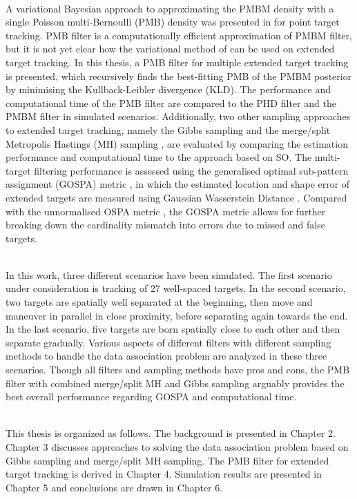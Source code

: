 ~\\
A variational Bayesian approach to approximating the PMBM density with a single Poisson multi-Bernoulli (PMB) density was presented in \cite{variational} for point target tracking. PMB filter is a computationally efficient approximation of PMBM filter, but it is not yet clear how the variational method of \cite{variational} can be used on extended target tracking. In this thesis, a PMB filter for multiple extended target tracking is presented, which recursively finds the best-fitting PMB of the PMBM posterior by minimising the Kullback-Leibler divergence (KLD). The performance and computational time of the PMB filter are compared to the PHD filter and the PMBM filter in simulated scenarios. Additionally, two other sampling approaches to extended target tracking, namely the Gibbs sampling \cite{gibbs} and the merge/split Metropolis Hastings (MH) sampling \cite{mergesplit}, are evaluated by comparing the estimation performance and computational time to the approach based on SO. The multi-target filtering performance is assessed using the generalised optimal sub-pattern assignment (GOSPA) metric \cite{gospa}, in which the estimated location and shape error of extended targets are measured using Gaussian Wasserstein Distance \cite{gwmetric}. Compared with the unnormalised OSPA metric \cite{ospa}, the GOSPA metric allows for further breaking down the cardinality mismatch into errors due to missed and false targets. 

~\\
In this work, three different scenarios have been simulated. The first scenario under consideration is tracking of 27 well-spaced targets. In the second scenario, two targets are spatially well separated at the beginning, then move and maneuver in parallel in close proximity, before separating again towards the end. In the last scenario, five targets are born spatially close to each other and then separate gradually. Various aspects of different filters with different sampling methods to handle the data association problem are analyzed in these three scenarios. Though all filters and sampling methods have pros and cons, the PMB filter with combined merge/split MH and Gibbs sampling arguably provides the best overall performance regarding GOSPA and computational time. 

~\\
This thesis is organized as follows. The background is presented in Chapter 2. Chapter 3 discusses approaches to solving the data association problem based on Gibbs sampling and merge/split MH sampling. The PMB filter for extended target tracking is derived in Chapter 4. Simulation results are presented in Chapter 5 and conclusions are drawn in Chapter 6. 

